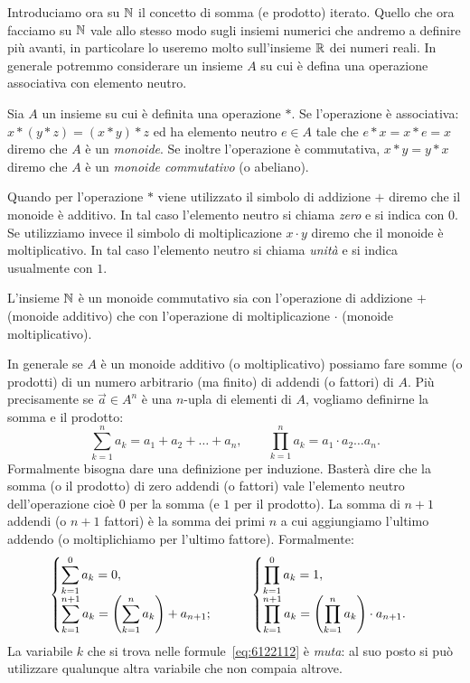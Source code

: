Introduciamo ora su ${\mathbb N}$ il concetto di somma (e prodotto) iterato.
Quello che ora facciamo su ${\mathbb N}$ vale allo stesso modo sugli insiemi 
numerici che andremo a definire più avanti, in particolare lo useremo 
molto sull'insieme ${\mathbb R}$ dei numeri reali. 
In generale potremmo considerare un insieme $A$ su 
cui è defina una operazione associativa 
con elemento neutro. 

\begin{definition}[monoide]%
\label{def:monoide}%
Sia $A$ un insieme su cui è definita una operazione $*$.
Se l'operazione è associativa: $x*(y*z) = (x*y)*z$ 
ed ha elemento neutro $e\in A$ tale che $e*x = x*e = x$
diremo che $A$ è un \emph{monoide}.
Se inoltre l'operazione è commutativa, $x*y=y*x$ 
diremo che $A$ è un \emph{monoide commutativo} (o abeliano).

Quando per l'operazione $*$ viene utilizzato il simbolo di addizione $+$
diremo che il monoide è additivo. In tal caso l'elemento neutro 
si chiama \emph{zero} e si indica con $0$.
Se utilizziamo invece il simbolo di moltiplicazione $x\cdot y$
diremo che il monoide è moltiplicativo. In tal caso l'elemento 
neutro si chiama \emph{unità} e si indica usualmente con $1$.
\end{definition}

L'insieme ${\mathbb N}$ è un monoide commutativo sia con l'operazione di addizione $+$ 
(monoide additivo) che con l'operazione di moltiplicazione 
$\cdot$ (monoide moltiplicativo).

In generale se $A$ è un monoide additivo 
(o moltiplicativo) possiamo fare somme (o prodotti) di un numero 
arbitrario (ma finito) di addendi (o fattori) di $A$.
Più precisamente se $\vec a \in A^n$ 
è una $n$-upla di elementi di $A$, 
vogliamo definirne la somma e il prodotto:
\begin{equation}\label{eq:6122112}
\sum_{k=1}^n a_k = a_1 + a_2 + \dots + a_n,
\qquad 
\prod_{k=1}^n a_k = a_1 \cdot a_2 \dots a_n.
\end{equation}
Formalmente bisogna dare una definizione per induzione. 
Basterà dire che la somma (o il prodotto)
di zero addendi (o fattori) vale l'elemento neutro 
dell'operazione cioè $0$ per la somma (e $1$ per il prodotto).
La somma di $n+1$ addendi (o $n+1$ fattori) è la somma dei primi $n$ 
a cui aggiungiamo l'ultimo addendo (o moltiplichiamo per l'ultimo fattore).
Formalmente:
\[
  \begin{cases}
    \displaystyle\sum_{k=1}^{0} a_k = 0, \\
    \displaystyle\sum_{k=1}^{n+1} a_k = {\left( \sum_{k=1}^{n} a_k \right)} + a_{n+1};
  \end{cases}  \qquad
  \begin{cases}
    \displaystyle\prod_{k=1}^{0} a_k = 1, \\
    \displaystyle\prod_{k=1}^{n+1} a_k = {\left( \prod_{k=1}^{n} a_k \right)} \cdot a_{n+1}.
  \end{cases}
\]
La variabile $k$ che si trova nelle formule~\eqref{eq:6122112} è \emph{muta}: 
al suo posto si può utilizzare qualunque altra variabile che non
compaia altrove.


